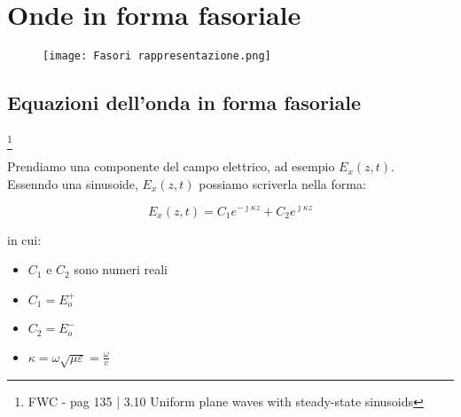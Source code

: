 \chapter{Onde in forma fasoriale} 

\begin{figure}[h]
    \centering
    \texttt{[image: Fasori rappresentazione.png]}
    
\end{figure}

\newpage 

\section{Equazioni dell'onda in forma fasoriale}

\footnote{FWC - pag 135 | 3.10 Uniform plane waves with steady-state sinusoids } 

Prendiamo una componente del campo elettrico, ad esempio $E_x (z,t)$. \\ 
Essenndo una sinusoide, $E_x (z,t)$ possiamo scriverla nella forma: 

{\Large \begin{equation}
    E_x (z,t) = C_1 e^{-\jmath \kappa z} + C_2 e^{\jmath \kappa z}
\end{equation}} 

in cui: 

\begin{itemize}
    \item $C_1$ e $C_2$ sono numeri reali 
    \item $C_1 = E_o ^+  $
    \item $C_2 = E_o ^-  $  
    \item $\kappa = \omega \sqrt{\mu \varepsilon} = \frac{\omega}{v}$
\end{itemize} 

